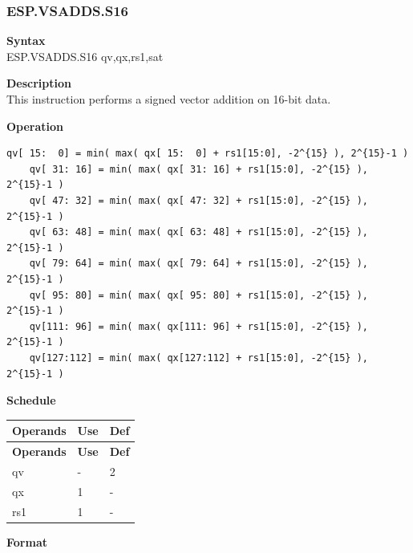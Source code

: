 \newpage
\subsubsection{ESP.VSADDS.S16}\label{instruction:ESPVSADDSS16}
\textbf{Syntax}\\
ESP.VSADDS.S16 qv,qx,rs1,sat

\textbf{Description}\\
This instruction performs a signed vector addition on 16-bit data.

\textbf{Operation}\\
\begin{lstlisting}[escapeinside=`?]
    qv[ 15:  0] = min( max( qx[ 15:  0] + rs1[15:0], -2^{15} ), 2^{15}-1 )
    qv[ 31: 16] = min( max( qx[ 31: 16] + rs1[15:0], -2^{15} ), 2^{15}-1 )
    qv[ 47: 32] = min( max( qx[ 47: 32] + rs1[15:0], -2^{15} ), 2^{15}-1 )
    qv[ 63: 48] = min( max( qx[ 63: 48] + rs1[15:0], -2^{15} ), 2^{15}-1 )
    qv[ 79: 64] = min( max( qx[ 79: 64] + rs1[15:0], -2^{15} ), 2^{15}-1 )
    qv[ 95: 80] = min( max( qx[ 95: 80] + rs1[15:0], -2^{15} ), 2^{15}-1 )
    qv[111: 96] = min( max( qx[111: 96] + rs1[15:0], -2^{15} ), 2^{15}-1 )
    qv[127:112] = min( max( qx[127:112] + rs1[15:0], -2^{15} ), 2^{15}-1 )
\end{lstlisting}


\textbf{Schedule}\\
\begin{longtable}[c]{|l|l|l|}
    \hline
    \rowcolor{lightgray}
    \textbf{Operands} & \textbf{Use} & \textbf{Def} \\\hline
    \endfirsthead
    \hline
    \rowcolor{lightgray}
     \textbf{Operands} & \textbf{Use} & \textbf{Def} \\\hline
    \endhead
    \hline
    \endfoot

  qv & - & 2 \\\hline
    qx & 1 & - \\\hline
    rs1 & 1 & -

\end{longtable}

\textbf{Format}\\

